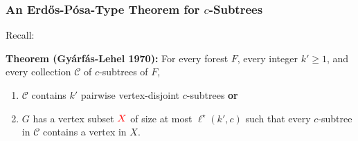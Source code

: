 \documentclass{beamer}
\begin{document}
\begin{frame}
\end{frame}


\begin{frame}
  \frametitle{An Erdős-Pósa-Type Theorem for $c$-Subtrees}

  Recall:

  \noindent\textbf{Theorem (Gyárfás-Lehel 1970):} For every forest $F$, every integer $k'\ge 1$, and every collection $\mathcal{C}$ of $c$-subtrees of $F$,
  \begin{enumerate}%
    \item $\mathcal{C}$ contains $k'$ pairwise vertex-disjoint $c$-subtrees \textbf{or}
    \item $G$ has a vertex subset $\mathcolor{red}{X}$ of size at most $\ell^\star(k',c)$ such that every $c$-subtree in $\mathcal{C}$ contains a vertex in $X$.
  \end{enumerate}
  \vspace{3ex}
  \vspace{2ex}
\end{frame}
\end{document}
